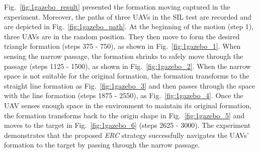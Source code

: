 Fig.~\ref{fig:1gazebo_result} presented the formation moving captured in the experiment. Moreover, the paths of three UAVs in the SIL test are recorded and are depicted in Fig.~\ref{fig:1gazebo_path}. At the beginning of the motion (step 1), three UAVs are in the random position. They then move to form the desired triangle formation (steps 375 - 750), as shown in Fig.~\ref{fig:1gazebo_1}. When sensing the narrow passage, the formation shrinks to safely move through the passage (steps 1125 - 1500), as shown in Fig.~\ref{fig:1gazebo_2}. When the narrow space is not suitable for the original formation, the formation transforms to the straight line formation as Fig.~\ref{fig:1gazebo_3} and then passes through the space with the line formation (steps 1875 - 2550), as Fig.~\ref{fig:1gazebo_4}. Once the UAV senses enough space in the environment to maintain its original formation, the formation transforms back to the origin shape in Fig.~\ref{fig:1gazebo_5} and moves to the target in Fig.~\ref{fig:1gazebo_6} (steps 2625 - 3000). The experiment demonstrates that the proposed \textit{ERC} strategy successfully navigates the UAVs' formation to the target by passing through the narrow passage.





